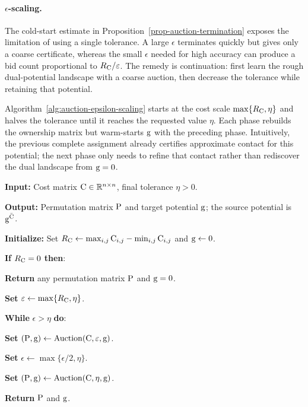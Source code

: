 \paragraph{$\epsilon$-scaling.}
The cold-start estimate in Proposition~\ref{prop-auction-termination} exposes the limitation of using a single tolerance. A large $\epsilon$ terminates quickly but gives only a coarse certificate, whereas the small $\epsilon$ needed for high accuracy can produce a bid count proportional to $R_\C/\epsilon$. The remedy is continuation: first learn the rough dual-potential landscape with a coarse auction, then decrease the tolerance while retaining that potential.

Algorithm~\ref{alg:auction-epsilon-scaling} starts at the cost scale $\max\{R_\C,\eta\}$ and halves the tolerance until it reaches the requested value $\eta$. Each phase rebuilds the ownership matrix but warm-starts $\gD$ with the preceding phase. Intuitively, the previous complete assignment already certifies approximate contact for this potential; the next phase only needs to refine that contact rather than rediscover the dual landscape from $\gD=0$.

\begin{algH}\label{alg:auction-epsilon-scaling}
\textbf{Input:} Cost matrix $\C\in\RR^{n\times n}$, final tolerance $\eta>0$.

\textbf{Output:} Permutation matrix $\P$ and target potential $\gD$; the source potential is $\gD^{\bar\C}$.

\textbf{Initialize:} Set $R_\C\leftarrow\max_{i,j}\C_{i,j}-\min_{i,j}\C_{i,j}$ and $\gD\leftarrow0$.

\textbf{If} $R_\C=0$ \textbf{then}:
\begin{algblock}
\textbf{Return} any permutation matrix $\P$ and $\gD=0$.
\end{algblock}

\textbf{Set} $\epsilon\leftarrow\max\{R_\C,\eta\}$.

\textbf{While} $\epsilon>\eta$ \textbf{do}:
\begin{algblock}
\textbf{Set} $(\P,\gD)\leftarrow\operatorname{Auction}(\C,\epsilon,\gD)$.

\textbf{Set} $\epsilon\leftarrow\max\{\epsilon/2,\eta\}$.
\end{algblock}

\textbf{Set} $(\P,\gD)\leftarrow\operatorname{Auction}(\C,\eta,\gD)$.
\par\noindent
\textbf{Return} $\P$ and $\gD$.
\end{algH}

